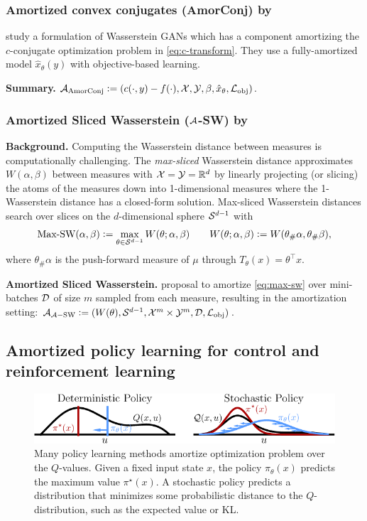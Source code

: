 \documentclass[twoside,11pt]{article}
\begin{document}
\subsubsection{Amortized convex conjugates (AmorConj) by \citet{nhan2019threeplayer}}
\citet{nhan2019threeplayer} study a formulation of Wasserstein GANs which
has a component amortizing the $c$-conjugate optimization problem in
\cref{eq:c-transform}.
They use a fully-amortized model $\hat x_\theta(y)$ with
objective-based learning.

\textbf{Summary.}
${\mathcal{A}}_{\rm AmorConj}\vcentcolon= (c(\cdot, y)-f(\cdot), {\mathcal{X}}, {\mathcal{Y}}, \beta, \hat x_\theta, {\mathcal{L}}_{\rm obj})$.

\subsubsection{Amortized Sliced Wasserstein (${\mathcal{A}}$-SW) by \citet{nguyen2022amortized}}
{\bf Background.}
Computing the Wasserstein distance between measures is computationally challenging.
The \emph{max-sliced} Wasserstein distance \citep{deshpande2019max} approximates
$W(\alpha, \beta)$ between measures with ${\mathcal{X}}={\mathcal{Y}}=\mathbb{R}^d$ by linearly projecting
(or slicing) the atoms of the measures down into 1-dimensional measures
where the 1-Wasserstein distance has a closed-form solution.
Max-sliced Wasserstein distances search over slices on the $d$-dimensional
sphere ${\mathcal{S}}^{d-1}$ with
\begin{equation}
  \textnormal{Max-SW}(\alpha, \beta)\vcentcolon= \max_{\theta\in{\mathcal{S}}^{d-1}} W(\theta; \alpha, \beta) \qquad W(\theta; \alpha, \beta)\vcentcolon= W(\theta_\#\alpha, \theta_\#\beta),
  \label{eq:max-sw}
\end{equation}
where $\theta_\#\alpha$ is the push-forward measure of $\mu$ through
$T_\theta(x)=\theta^\top x$.

{\bf Amortized Sliced Wasserstein.} \citet{nguyen2022amortized}
proposal to amortize \cref{eq:max-sw} over mini-batches ${\mathcal{D}}$ of size $m$
sampled from each measure, resulting in the amortization setting:
${\mathcal{A}}_{{\mathcal{A}}-{\rm SW}}\vcentcolon= (W(\theta), {\mathcal{S}}^{d-1}, {\mathcal{X}}^m\times{\mathcal{Y}}^m, {\mathcal{D}}, {\mathcal{L}}_{\rm obj})$.

\subsection{Amortized policy learning for control
  and reinforcement learning}
\label{sec:apps:ctrl}

\begin{figure}[t]
  \centering
  \includegraphics[width=\textwidth]{fig/ctrl.pdf}
  \caption{
    Many policy learning methods amortize
    optimization problem over the $Q$-values.
    Given a fixed input state $x$,
    the policy $\pi_\theta(x)$ predicts the
    maximum value $\pi^\star(x)$.
    A stochastic policy predicts
    a distribution that minimizes some probabilistic distance to
    the $Q$-distribution, such as the expected
    value or KL.
  }
  \label{fig:ctrl}
\end{figure}
\end{document}
